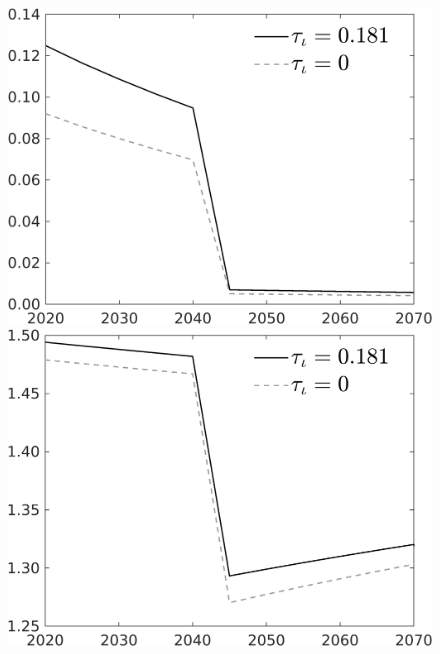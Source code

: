 \documentclass[12pt]{article}
\begin{document}
\begin{figure}[h!!]
\begin{minipage}[]{0.32\textwidth}
	\end{minipage}	
	\begin{minipage}[]{0.32\textwidth}
		\includegraphics[width=1\textwidth]{../../codding_model/own_basedOnFried/optimalPol_010922_revision/figures/all_13Sept22/CompTauf_bytaul_Reg0_gAf_spillover0_nsk0_xgr0_knspil1_sep0_LFlimit1_emsbase0_countec0_GovRev0_etaa0.79_lgd1.png}
	\end{minipage}	
	\begin{minipage}[]{0.32\textwidth}
		\includegraphics[width=1\textwidth]{../../codding_model/own_basedOnFried/optimalPol_010922_revision/figures/all_13Sept22/CompTauf_bytaul_Reg0_gAn_spillover0_nsk0_xgr0_knspil1_sep0_LFlimit1_emsbase0_countec0_GovRev0_etaa0.79_lgd1.png}

\end{minipage}
\end{figure}
\end{document}
